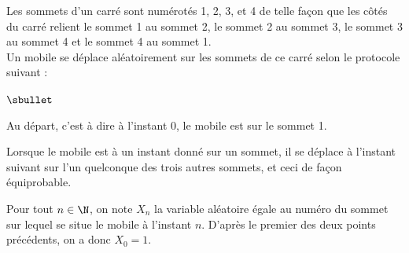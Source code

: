 \noindent
Les sommets d'un carré sont numérotés 1, 2, 3, et 4 de telle façon que
les côtés du carré relient le sommet 1 au sommet 2, le sommet 2 au
sommet 3, le sommet 3 au sommet 4 et le sommet 4 au sommet 1.\\
Un mobile se déplace aléatoirement sur les sommets de ce carré selon
le protocole suivant :
\begin{noliste}{$\sbullet$}
\item Au départ, c'est à dire à l'instant $0$, le mobile est sur le
  sommet 1.
\item Lorsque le mobile est à un instant donné sur un sommet, il se
  déplace à l'instant suivant sur l'un quelconque des trois autres
  sommets, et ceci de façon équiprobable.
\end{noliste}
Pour tout $n \in \N$, on note $X_{n}$ la variable aléatoire égale au
numéro du sommet sur lequel se situe le mobile à l'instant
$n$. D'après le premier des deux points précédents, on a donc $X_{0} =
1$.
